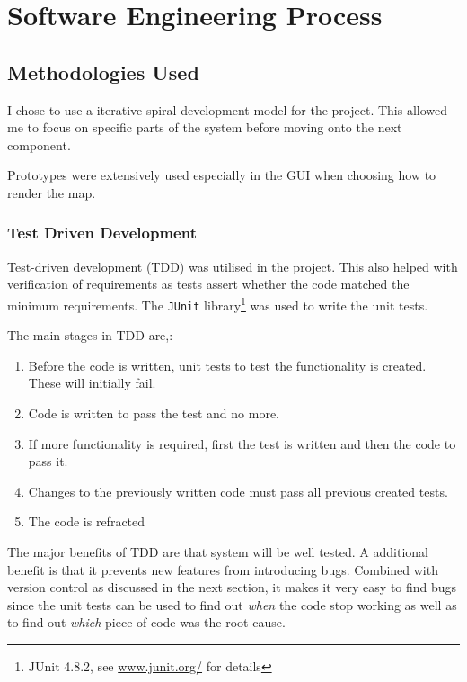 \section{Software Engineering Process}

\subsection{Methodologies Used}
\label{sub:methodologies_used}

I chose to use a iterative spiral development model for the project. This allowed me to focus on specific parts of the system before moving onto the next component. 

Prototypes were extensively used especially in the GUI when choosing how to render the map. %


\subsubsection{Test Driven Development}
Test-driven development (TDD) was utilised in the project. This also helped with verification of requirements as tests assert whether the code matched the minimum requirements. The \texttt{JUnit} library\footnote{JUnit 4.8.2, see \url{www.junit.org/} for details } was used to write the unit tests.  

The main stages in TDD are\cite{murphytest},\cite{desai2008survey}:
\begin{enumerate}[noitemsep ]
	\item Before the code is written, unit tests to test the functionality is created. These will initially fail.
   \item Code is written to pass the test and no more.
   \item If more functionality is required, first the test is written and then the code to pass it.
   \item Changes to the previously written code must pass all previous created tests.
   \item The code is refracted 
\end{enumerate}

The major benefits of TDD are that system will be well tested.  A additional benefit is that  it  prevents new features from introducing bugs. Combined with version control as discussed in the next section, it makes it very easy to find bugs since the unit tests can be used to find out \emph{when} the code stop working as well as to find out \emph{which} piece of code was the root cause.

